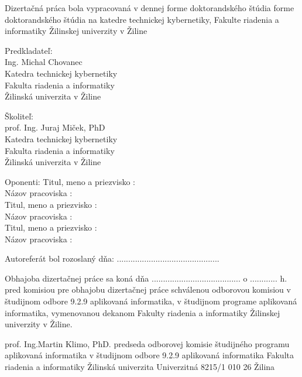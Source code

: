 \begin{titlepage}


Dizertačná práca bola vypracovaná v dennej forme doktorandského štúdia forme doktorandského štúdia
na katedre technickej kybernetiky, Fakulte riadenia a informatiky Žilinskej univerzity v Žiline


\vfill

Predkladateľ: \\
Ing. Michal Chovanec \\
Katedra technickej kybernetiky \\
Fakulta riadenia a informatiky \\
Žilinská univerzita v Žiline \\

\vfill

Školiteľ:	\\
prof. Ing. Juraj Miček, PhD \\
Katedra technickej kybernetiky \\
Fakulta riadenia a informatiky \\
Žilinská univerzita v Žiline \\

\vfill
\vfill
\vfill


Oponenti:
\vfill
Titul, meno a priezvisko  : \\
Názov pracoviska          : \\
\vfill
Titul, meno a priezvisko  : \\
Názov pracoviska          : \\
\vfill
Titul, meno a priezvisko  : \\
Názov pracoviska          : \\

\vfill
\vfill

Autoreferát bol rozoslaný dňa: .............................................

\vfill

Obhajoba dizertačnej práce sa koná dňa ....................................... o ............ h.
pred komisiou pre obhajobu dizertačnej práce schválenou odborovou komisiou v študijnom
odbore 9.2.9 aplikovaná informatika, v študijnom programe aplikovaná informatika,
vymenovanou dekanom Fakulty riadenia a informatiky Žilinskej univerzity v Žiline.


\vfill


prof. Ing.Martin Klimo, PhD.
predseda odborovej komisie
študijného programu aplikovaná informatika
v študijnom odbore 9.2.9 aplikovaná informatika
Fakulta riadenia a informatiky
Žilinská univerzita
Univerzitná 8215/1
010 26 Žilina


\end{titlepage}















